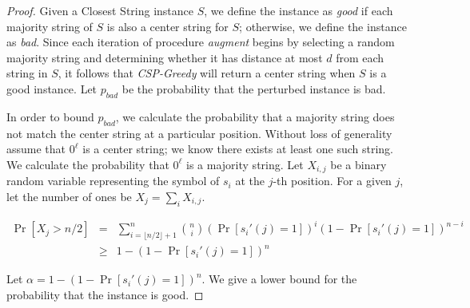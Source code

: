 \begin{proof}  Given a {\sc Closest String} instance $S$, we define the instance as {\em good} if each majority string of $S$ is also a center string for $S$; otherwise, we define the instance as {\em bad}. Since each iteration of procedure {\em augment} begins by selecting a random majority string and determining whether it has distance at most $d$ from each string in $S$, it follows that {\em CSP-Greedy} will return a center string when $S$ is a good instance. Let $p_{bad}$ be the probability that the perturbed instance is bad. 

In order to bound $p_{bad}$, we calculate the probability that a majority string does not match the center string at a particular position. Without loss of generality assume that $0^{\ell}$ is a center string; we know there exists at least one such string. We calculate the probability that $0^{\ell}$ is a majority string. Let $X_{i, j}$ be a binary random variable representing the symbol of $s_i$ at the $j$-th position.  For a given $j$, let the number of ones be $X_j = \sum_{i} X_{i,j}$. 

\begin{eqnarray*}
\Pr[X_j > n/2] 	& = & \sum_{i = \lfloor n/2 \rfloor + 1}^n {n \choose i} (\Pr[s_i'(j) = 1])^i (1 - \Pr[s_i'(j) = 1])^{n - i} \\ 
						& \geq  &1  - (1 - \Pr[s_i'(j) = 1])^n 
\end{eqnarray*} 

Let $\alpha = 1  - (1 - \Pr[s_i'(j) = 1])^n$. We give a lower bound for the probability that the instance is good.


\end{proof}
